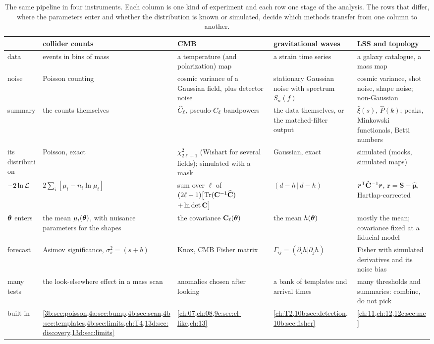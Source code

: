 \begin{table}[htbp]
\centering
\footnotesize
\renewcommand{\arraystretch}{1.28}
\begin{tabularx}{\linewidth}{@{}>{\raggedright\arraybackslash}p{2.0cm}
  >{\raggedright\arraybackslash}X >{\raggedright\arraybackslash}X
  >{\raggedright\arraybackslash}X >{\raggedright\arraybackslash}X@{}}
\toprule
 & \textbf{collider counts} & \textbf{CMB} & \textbf{gravitational waves} & \textbf{LSS and topology}\\
\midrule
data & events in bins of mass & a temperature (and polarization) map & a strain time series & a galaxy catalogue, a mass map\\
noise & Poisson counting & cosmic variance of a Gaussian field, plus detector noise & stationary Gaussian noise with spectrum $S_n(f)$ & cosmic variance, shot noise, shape noise; non-Gaussian\\
summary & the counts themselves & $\widehat{C}_\ell$, pseudo-$C_\ell$ bandpowers & the data themselves, or the matched-filter output & $\hat\xi(s)$, $\hat P(k)$; peaks, Minkowski functionals, Betti numbers\\
its distribution & Poisson, exact & $\chi^2_{2\ell+1}$ (Wishart for several fields); simulated with a mask & Gaussian, exact & simulated (mocks, simulated maps)\\
$-2\ln\mathcal{L}$ & $2\sum_i[\mu_i-n_i\ln\mu_i]$ & sum over $\ell$ of $(2\ell+1)\bigl[\operatorname{Tr}(\mathbf{C}^{-1}\widehat{\mathbf{C}})$ $+\ln\det\mathbf{C}\bigr]$ & $(d-h\,|\,d-h)$ & $\bm r^{\mathsf{T}}\hat{\mathbf{C}}^{-1}\bm r$, $\bm r=\bm S-\hat{\bm\mu}$, Hartlap-corrected\\
$\bm{\theta}$ enters & the mean $\mu_i(\bm{\theta})$, with nuisance parameters for the shapes & the covariance $\mathbf{C}_\ell(\bm{\theta})$ & the mean $h(\bm{\theta})$ & mostly the mean; covariance fixed at a fiducial model\\
forecast & Asimov significance, $\sigma_s^2=(s+b)$ & Knox, CMB Fisher matrix & $\Gamma_{ij}=(\partial_ih|\partial_jh)$ & Fisher with simulated derivatives and its noise bias\\
many tests & the look-elsewhere effect in a mass scan & anomalies chosen after looking & a bank of templates and arrival times & many thresholds and summaries: combine, do not pick\\
built in & \cref{3b:sec:poisson,4a:sec:bump,4b:sec:scan,4b:sec:templates,4b:sec:limits,ch:T4,13d:sec:discovery,13d:sec:limits} & \cref{ch:07,ch:08,9c:sec:cl-like,ch:13} & \cref{ch:T2,10b:sec:detection,10b:sec:fisher} & \cref{ch:11,ch:12,12c:sec:mc}\\
\bottomrule
\end{tabularx}
\caption{The same pipeline in four instruments. Each column is one kind of experiment
and each row one stage of the analysis. The rows that differ, where the parameters
enter and whether the distribution is known or simulated, decide which methods
transfer from one column to another.}
\label{14a:tab:universal}
\end{table}

